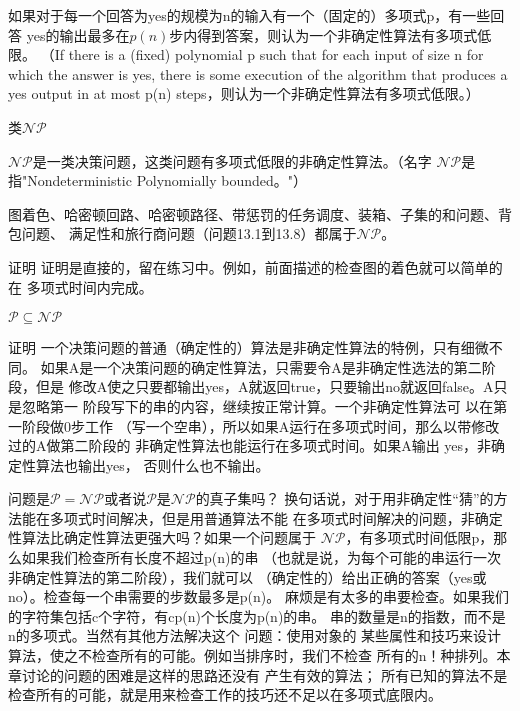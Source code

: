 如果对于每一个回答为yes的规模为n的输入有一个（固定的）多项式p，有一些回答
yes的输出最多在$p(n)$步内得到答案，则认为一个非确定性算法有多项式低限。
（If there is a (fixed) polynomial p such that for each input of size n for
which the answer is yes, there is some execution of the algorithm that produces
a yes output in at most p(n) steps，则认为一个非确定性算法有多项式低限。）

\begin{definition}
类$\mathcal{NP}$

$\mathcal{NP}$是一类决策问题，这类问题有多项式低限的非确定性算法。（名字
$\mathcal{NP}$是指"Nondeterministic Polynomially bounded。"）
\end{definition}

\begin{theorem}
图着色、哈密顿回路、哈密顿路径、带惩罚的任务调度、装箱、子集的和问题、背包问题、
满足性和旅行商问题（问题13.1到13.8）都属于$\mathcal{NP}$。

证明  证明是直接的，留在练习中。例如，前面描述的检查图的着色就可以简单的在
多项式时间内完成。
\end{theorem}

\begin{theorem}
$\mathcal{P}\subseteq \mathcal{NP}$

证明  一个决策问题的普通（确定性的）算法是非确定性算法的特例，只有细微不同。
如果A是一个决策问题的确定性算法，只需要令A是非确定性选法的第二阶段，但是
修改A使之只要都输出yes，A就返回true，只要输出no就返回false。A只是忽略第一
阶段写下的串的内容，继续按正常计算。一个非确定性算法可 以在第一阶段做0步工作
（写一个空串），所以如果A运行在多项式时间，那么以带修改过的A做第二阶段的
非确定性算法也能运行在多项式时间。如果A输出 yes，非确定性算法也输出yes，
否则什么也不输出。
\end{theorem}

问题是$\mathcal{P}=\mathcal{NP}$或者说$\mathcal{P}$是$\mathcal{NP}$的真子集吗？
换句话说，对于用非确定性“猜”的方法能在多项式时间解决，但是用普通算法不能
在多项式时间解决的问题，非确定性算法比确定性算法更强大吗？如果一个问题属于
$\mathcal{NP}$，有多项式时间低限p，那么如果我们检查所有长度不超过p(n)的串
（也就是说，为每个可能的串运行一次 非确定性算法的第二阶段），我们就可以
（确定性的）给出正确的答案（yes或no）。检查每一个串需要的步数最多是p(n)。
麻烦是有太多的串要检查。如果我们的字符集包括c个字符，有cp(n)个长度为p(n)的串。
串的数量是n的指数，而不是n的多项式。当然有其他方法解决这个 问题：使用对象的
某些属性和技巧来设计算法，使之不检查所有的可能。例如当排序时，我们不检查
所有的n！种排列。本章讨论的问题的困难是这样的思路还没有 产生有效的算法；
所有已知的算法不是检查所有的可能，就是用来检查工作的技巧还不足以在多项式底限内。

